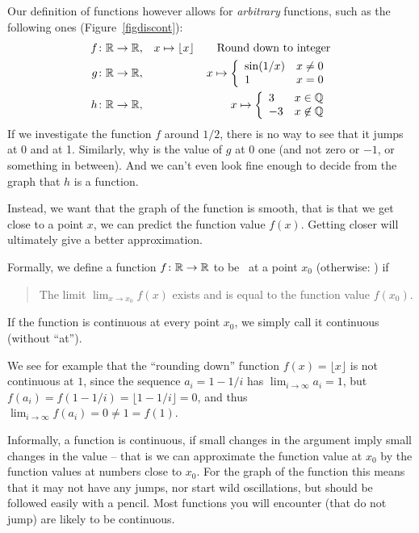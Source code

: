 Our definition of functions however allows for {\em arbitrary} functions, such as the
following ones (Figure~\ref{figdiscont}):
\begin{eqnarray*}
f\colon{\mathbb R}\to{\mathbb R}&,& x\mapsto \lfloor x\rfloor\qquad\mbox{Round down to integer}\\
g\colon{\mathbb R}\to{\mathbb R}&,& x\mapsto
\left\{\begin{array}{ll}
\sin(1/x)&x\not=0\\
1&x=0\\
\end{array}
\right.\\
h\colon{\mathbb R}\to{\mathbb R}&,& x\mapsto
\left\{\begin{array}{ll}
3&x\in{\mathbb Q}\\
-3&x\not\in{\mathbb Q}\\
\end{array}
\right.
\end{eqnarray*}
If we investigate the function $f$ around $1/2$, there is no way to see that it jumps at
0 and at 1. Similarly, why is the value of $g$ at $0$ one (and not zero or $-1$, or
something in between). And we can't even look fine enough to decide from the graph that
$h$ is a function.

Instead, we want that the graph of the function is smooth, that is that we get close to
a point $x$, we can predict the function value $f(x)$. Getting closer will ultimately
give a better approximation.

Formally, we define a function $f\colon{\mathbb R}\to{\mathbb R}$ to be~ at a point $x_0$
(otherwise: ) if
\begin{quote}
The limit $\displaystyle\lim_{x\to x_0} f(x)$ exists and is equal to the
function value $f(x_0)$.
\end{quote}

If the function is continuous at every point $x_0$, we simply call it continuous (without
``at'').

We see for example that the ``rounding down''
function $f(x)=\lfloor x\rfloor$  is not continuous at $1$,
since the sequence $a_i=1-1/i$ has $\lim_{i\to\infty} a_i=1$, but
$f(a_i)=f(1-1/i)=\lfloor 1-1/i\rfloor=0$, and thus $\lim_{i\to\infty}
f(a_i)=0\not=1=f(1)$.
\medskip

Informally, a function is continuous, if small changes in the argument imply small
changes in the value -- that is we can approximate the function value at $x_0$ by the
function values at numbers close to $x_0$. For the graph of the function
this means that it may not have any jumps, nor start wild oscillations, but
should be followed easily with a pencil. Most functions you will encounter
(that do not jump) are likely to be continuous.

